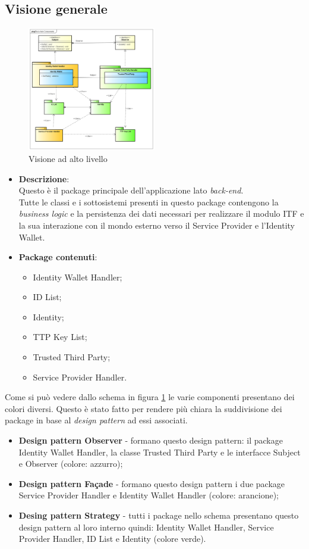 \subsection{Visione generale}
\begin{figure}[!h]
	\centering
	\includegraphics[width=0.5\textwidth]{immagini/architettura_alto_livello}
	\caption{Visione ad alto livello}
	\label{fig:visioneAltoLivello}
\end{figure}
\begin{itemize}
	\item \textbf{Descrizione}:\\
	Questo è il package principale dell'applicazione lato \textit{back-end}.\\
	Tutte le classi e i sottosistemi presenti in questo package contengono la \textit{business logic} e la persistenza dei dati necessari per realizzare il modulo \gls{ITF} e la sua interazione con il mondo esterno verso il Service Provider e l'Identity Wallet.
	\item \textbf{Package contenuti}:\\
	\begin{itemize}
		\item Identity Wallet Handler;
		\item ID List;
		\item Identity;
		\item TTP Key List;
		\item Trusted Third Party;
		\item Service Provider Handler.
	\end{itemize}	
\end{itemize}
Come si può vedere dallo schema in figura \ref{fig:visioneAltoLivello} le varie componenti presentano dei colori diversi. Questo è stato fatto per rendere più chiara la suddivisione dei package in base al \textit{design pattern} ad essi associati.\\
\begin{itemize}
	\item \textbf{Design pattern Observer} - formano questo design pattern: il package Identity Wallet Handler, la classe Trusted Third Party e le interfacce Subject e Observer (colore: azzurro);
	\item \textbf{Design pattern Façade} - formano questo design pattern i due package Service Provider Handler e Identity Wallet Handler (colore: arancione);
	\item \textbf{Desing pattern Strategy} - tutti i package nello schema presentano questo design pattern al loro interno quindi: Identity Wallet Handler, Service Provider Handler, ID List e Identity (colore verde).
\end{itemize}
